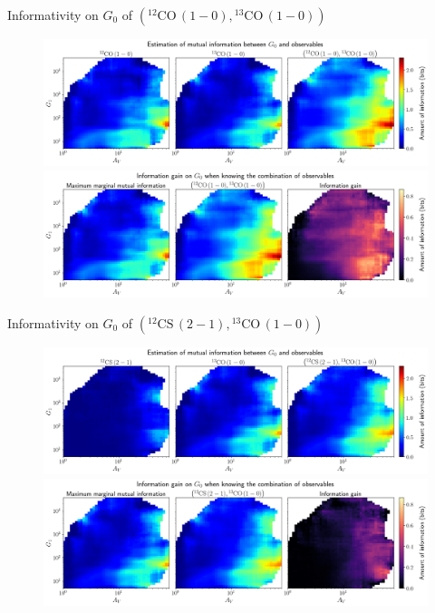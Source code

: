 \documentclass{beamer}
\begin{document}
\begin{frame}{Informativity on $G_0$ of $\left(\mathrm{^{12}CO\,(1-0)},\mathrm{^{13}CO\,(1-0)}\right)$}
    \begin{figure}
        \centering
        \includegraphics[width=0.95\linewidth]{../mi/g0__12co10_13co10_mi.png}
        \vfill
        \includegraphics[width=0.95\linewidth]{../mi/g0__12co10_13co10_mi_gain.png}
    \end{figure}
\end{frame}

\begin{frame}{Informativity on $G_0$ of $\left(\mathrm{^{12}CS\,(2-1)},\mathrm{^{13}CO\,(1-0)}\right)$}
    \begin{figure}
        \centering
        \includegraphics[width=0.95\linewidth]{../mi/g0__12cs21_13co10_mi.png}
        \vfill
        \includegraphics[width=0.95\linewidth]{../mi/g0__12cs21_13co10_mi_gain.png}
    \end{figure}
\end{frame}
\end{document}
